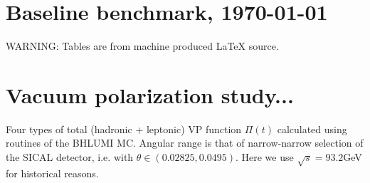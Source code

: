 \documentclass[12pt]{article}
\def\Energy{92.3GeV}
\def\Process{$e^+e^-\to e^+e^-$}
\begin{document}



\section{Baseline benchmark, \today}
WARNING: Tables are from machine produced LaTeX source.

\begin{table}[!h]
\begin{center}
{}
\end{center}
\caption{\sf
{\bf Results from BHLUMI Monte Carlo for \Process\ at \Energy.}
Reproducing Tables 14 and 16 in Proc. of workshop 1996.
%
Here VP and Z are switched ON.
S. Eidelman, F. Jegerlehner, Z. Phys. C (1995)
%
Energy cut on $z_{\min}=s'/s$ for BARE1
and $z_{\min}=4 E_1 E_2 /s$ for CALO2 and SICAL2.
%
Statistics 3G events (1h run on 24 processors).
}
\end{table}

\newpage
\section{Vacuum polarization study...}

\begin{table}[!h]
\begin{center}
{}
\end{center}
\caption{\sf
Four types of total (hadronic + leptonic) VP function $\Pi(t)$
calculated using routines of the BHLUMI MC.
Angular range is that of narrow-narrow selection of the SICAL detector,
i.e. with $\theta \in (0.02825, 0.0495)$.
Here we use $\sqrt{s}=93.2$GeV for historical reasons.
}
\end{table}
\end{document}

